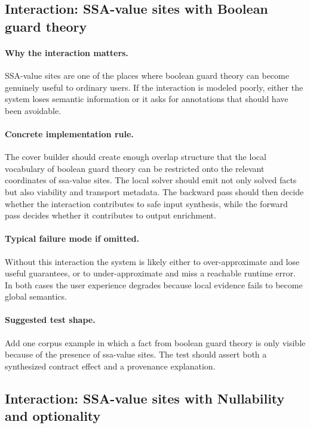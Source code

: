 \documentclass[11pt]{report}
\theoremstyle{definition}
\theoremstyle{plain}
\begin{document}
\subsection{Interaction: SSA-value sites with Boolean guard theory}

\paragraph{Why the interaction matters.}
SSA-value sites are one of the places where boolean guard theory can become
genuinely useful to ordinary users. If the interaction is modeled poorly,
either the system loses semantic information or it asks for annotations that
should have been avoidable.

\paragraph{Concrete implementation rule.}
The cover builder should create enough overlap structure that the local
vocabulary of boolean guard theory can be restricted onto the relevant
coordinates of ssa-value sites. The local solver should emit not only
solved facts but also viability and transport metadata. The backward pass
should then decide whether the interaction contributes to safe input
synthesis, while the forward pass decides whether it contributes to output
enrichment.

\paragraph{Typical failure mode if omitted.}
Without this interaction the system is likely either to over-approximate and
lose useful guarantees, or to under-approximate and miss a reachable runtime
error. In both cases the user experience degrades because local evidence
fails to become global semantics.

\paragraph{Suggested test shape.}
Add one corpus example in which a fact from boolean guard theory is only
visible because of the presence of ssa-value sites. The test should
assert both a synthesized contract effect and a provenance explanation.

\subsection{Interaction: SSA-value sites with Nullability and optionality}
\end{document}
